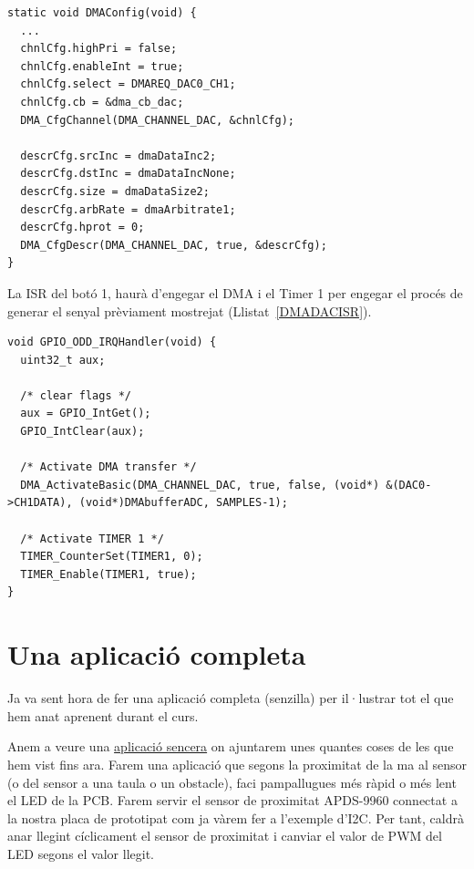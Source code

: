 \begin{lstlisting}[style=customc,caption=Configuració del PRS i el Timer, label=DMADACDMA]
static void DMAConfig(void) {
  ...
  chnlCfg.highPri = false;
  chnlCfg.enableInt = true;
  chnlCfg.select = DMAREQ_DAC0_CH1;
  chnlCfg.cb = &dma_cb_dac;
  DMA_CfgChannel(DMA_CHANNEL_DAC, &chnlCfg);

  descrCfg.srcInc = dmaDataInc2;
  descrCfg.dstInc = dmaDataIncNone;
  descrCfg.size = dmaDataSize2;
  descrCfg.arbRate = dmaArbitrate1;
  descrCfg.hprot = 0;
  DMA_CfgDescr(DMA_CHANNEL_DAC, true, &descrCfg);
}
\end{lstlisting}


La ISR del botó 1, haurà d'engegar el DMA i el Timer 1 per engegar el procés de generar el senyal prèviament mostrejat (Llistat~\ref{DMADACISR}).

\begin{lstlisting}[style=customc,caption=ISR del botó 1, label=DMADACISR]
void GPIO_ODD_IRQHandler(void) {
  uint32_t aux;

  /* clear flags */
  aux = GPIO_IntGet();
  GPIO_IntClear(aux);

  /* Activate DMA transfer */
  DMA_ActivateBasic(DMA_CHANNEL_DAC, true, false, (void*) &(DAC0->CH1DATA), (void*)DMAbufferADC, SAMPLES-1);

  /* Activate TIMER 1 */
  TIMER_CounterSet(TIMER1, 0);
  TIMER_Enable(TIMER1, true);
}
\end{lstlisting}


\chapter{Una aplicació completa}
\label{ch:aplicaciosenzilla}
Ja va sent hora de fer una aplicació completa (senzilla) per il·lustrar tot el que hem anat aprenent durant el curs.

Anem a veure una \href{https://github.com/mariusmm/cursembedded/tree/master/Simplicity/Barebone_App_1}{aplicació sencera} on ajuntarem unes quantes coses de les que hem vist fins ara. Farem una aplicació que segons la proximitat de la ma al sensor (o del sensor a una taula o un obstacle), faci pampallugues més ràpid o més lent el LED de la PCB. Farem servir el sensor de proximitat APDS-9960 connectat a la nostra placa de prototipat com ja vàrem fer a l'exemple d'I2C. Per tant, caldrà anar llegint cíclicament el sensor de proximitat i canviar el valor de \gls{PWM} del LED segons el valor llegit.


